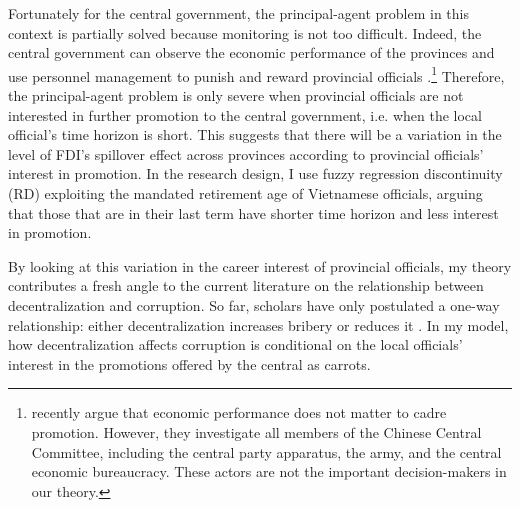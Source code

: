 Fortunately for the central government, the principal-agent problem in this context is partially solved because monitoring is not too difficult. Indeed, the central government can observe the economic performance of the provinces and use personnel management to punish and reward provincial officials \citep{Sheng2007, Li2005}.\footnote{\citet{Shih2012} recently argue that economic performance does not matter to cadre promotion. However, they investigate all members of the Chinese Central Committee, including the central party apparatus, the army, and the central economic bureaucracy. These actors are not the important decision-makers in our theory.} Therefore, the principal-agent problem is only severe when provincial officials are not interested in further promotion to the central government, i.e. when the local official's time horizon is short. This suggests that there will be a variation in the level of FDI's spillover effect across provinces according to provincial officials' interest in promotion. In the research design, I use fuzzy regression discontinuity (RD) exploiting the mandated retirement age of Vietnamese officials, arguing that those that are in their last term have shorter time horizon and less interest in promotion. 

By looking at this variation in the career interest of provincial officials, my theory contributes a fresh angle to the current literature on the relationship between decentralization and corruption. So far, scholars have only postulated a one-way relationship: either decentralization increases bribery \citep{Fan2009} or reduces it \citep{Guerra2009}. In my model, how decentralization affects corruption is conditional on the local officials' interest in the promotions offered by the central as carrots.


